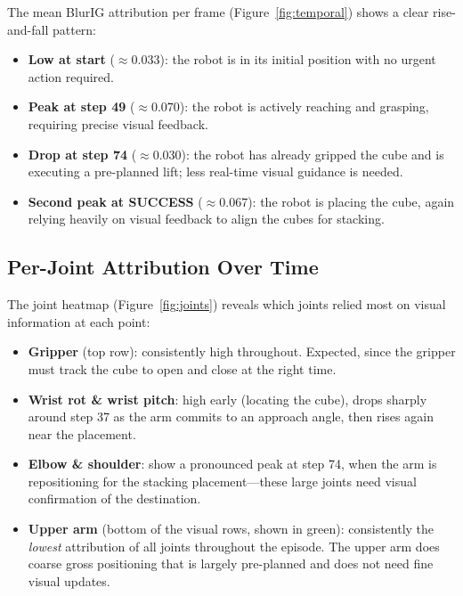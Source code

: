 \documentclass[11pt,a4paper]{article}
\begin{document}
The mean BlurIG attribution per frame (Figure~\ref{fig:temporal}) shows a
clear rise-and-fall pattern:
\begin{itemize}
    \item \textbf{Low at start} ($\approx 0.033$): the robot is in its initial
          position with no urgent action required.
    \item \textbf{Peak at step 49} ($\approx 0.070$): the robot is actively
          reaching and grasping, requiring precise visual feedback.
    \item \textbf{Drop at step 74} ($\approx 0.030$): the robot has already
          gripped the cube and is executing a pre-planned lift; less real-time
          visual guidance is needed.
    \item \textbf{Second peak at SUCCESS} ($\approx 0.067$): the robot is
          placing the cube, again relying heavily on visual feedback to align
          the cubes for stacking.
\end{itemize}

\subsection{Per-Joint Attribution Over Time}

The joint heatmap (Figure~\ref{fig:joints}) reveals which joints relied most
on visual information at each point:

\begin{itemize}
    \item \textbf{Gripper} (top row): consistently high throughout. Expected,
          since the gripper must track the cube to open and close at the right time.
    \item \textbf{Wrist rot \& wrist pitch}: high early (locating the cube),
          drops sharply around step 37 as the arm commits to an approach angle,
          then rises again near the placement.
    \item \textbf{Elbow \& shoulder}: show a pronounced peak at step 74, when
          the arm is repositioning for the stacking placement---these large
          joints need visual confirmation of the destination.
    \item \textbf{Upper arm} (bottom of the visual rows, shown in green):
          consistently the \emph{lowest} attribution of all joints throughout
          the episode. The upper arm does coarse gross positioning that is
          largely pre-planned and does not need fine visual updates.
\end{itemize}
\end{document}
